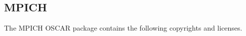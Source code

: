 %
%
% 
% 
% 
% 
%

\subsection{MPICH}
The MPICH OSCAR package contains the following copyrights and
licenses.

